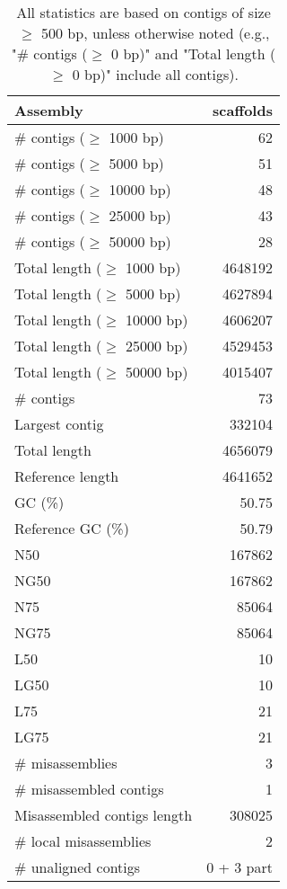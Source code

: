 \documentclass[12pt,a4paper]{article}
\begin{document}
\begin{table}[ht]
\begin{center}
\caption{All statistics are based on contigs of size $\geq$ 500 bp, unless otherwise noted (e.g., "\# contigs ($\geq$ 0 bp)" and "Total length ($\geq$ 0 bp)" include all contigs).}
\begin{tabular}{|l*{1}{|r}|}
\hline
Assembly & scaffolds \\ \hline
\# contigs ($\geq$ 1000 bp) & 62 \\ \hline
\# contigs ($\geq$ 5000 bp) & 51 \\ \hline
\# contigs ($\geq$ 10000 bp) & 48 \\ \hline
\# contigs ($\geq$ 25000 bp) & 43 \\ \hline
\# contigs ($\geq$ 50000 bp) & 28 \\ \hline
Total length ($\geq$ 1000 bp) & 4648192 \\ \hline
Total length ($\geq$ 5000 bp) & 4627894 \\ \hline
Total length ($\geq$ 10000 bp) & 4606207 \\ \hline
Total length ($\geq$ 25000 bp) & 4529453 \\ \hline
Total length ($\geq$ 50000 bp) & 4015407 \\ \hline
\# contigs & 73 \\ \hline
Largest contig & 332104 \\ \hline
Total length & 4656079 \\ \hline
Reference length & 4641652 \\ \hline
GC (\%) & 50.75 \\ \hline
Reference GC (\%) & 50.79 \\ \hline
N50 & 167862 \\ \hline
NG50 & 167862 \\ \hline
N75 & 85064 \\ \hline
NG75 & 85064 \\ \hline
L50 & 10 \\ \hline
LG50 & 10 \\ \hline
L75 & 21 \\ \hline
LG75 & 21 \\ \hline
\# misassemblies & 3 \\ \hline
\# misassembled contigs & 1 \\ \hline
Misassembled contigs length & 308025 \\ \hline
\# local misassemblies & 2 \\ \hline
\# unaligned contigs & 0 + 3 part \\ \hline

\end{tabular}
\end{center}
\end{table}
\end{document}
